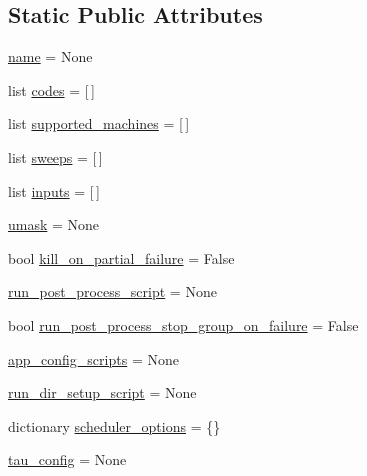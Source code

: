 \subsection*{Static Public Attributes}
\begin{DoxyCompactItemize}
\item 
\hyperlink{classcodar_1_1cheetah_1_1model_1_1_campaign_abc6944cb247705f1e7059d59537836d0}{name} = None
\item 
list \hyperlink{classcodar_1_1cheetah_1_1model_1_1_campaign_a963d2407a8818742d80cdabd0b462dc6}{codes} = \mbox{[}$\,$\mbox{]}
\item 
list \hyperlink{classcodar_1_1cheetah_1_1model_1_1_campaign_a06c63b2936ba8b23426ce41472dcbfd4}{supported\+\_\+machines} = \mbox{[}$\,$\mbox{]}
\item 
list \hyperlink{classcodar_1_1cheetah_1_1model_1_1_campaign_a298ec8ce182bf48901b0a40332de3c6d}{sweeps} = \mbox{[}$\,$\mbox{]}
\item 
list \hyperlink{classcodar_1_1cheetah_1_1model_1_1_campaign_a95d21ac374c6126edc3c82b8f953b9af}{inputs} = \mbox{[}$\,$\mbox{]}
\item 
\hyperlink{classcodar_1_1cheetah_1_1model_1_1_campaign_a7923c1c6debd3f7ce3c1730d21cdfb80}{umask} = None
\item 
bool \hyperlink{classcodar_1_1cheetah_1_1model_1_1_campaign_a1b3525f75cec5b7d738a1aea32c44612}{kill\+\_\+on\+\_\+partial\+\_\+failure} = False
\item 
\hyperlink{classcodar_1_1cheetah_1_1model_1_1_campaign_a86d1217f25978d2210e2ddd6d2a99937}{run\+\_\+post\+\_\+process\+\_\+script} = None
\item 
bool \hyperlink{classcodar_1_1cheetah_1_1model_1_1_campaign_a063e53373a2750fcdbf7eec7ebaa101b}{run\+\_\+post\+\_\+process\+\_\+stop\+\_\+group\+\_\+on\+\_\+failure} = False
\item 
\hyperlink{classcodar_1_1cheetah_1_1model_1_1_campaign_a434f06408e6b364e0efc232fa107eb33}{app\+\_\+config\+\_\+scripts} = None
\item 
\hyperlink{classcodar_1_1cheetah_1_1model_1_1_campaign_aa7d421cedfa8ffb615f6fd8f38b208ef}{run\+\_\+dir\+\_\+setup\+\_\+script} = None
\item 
dictionary \hyperlink{classcodar_1_1cheetah_1_1model_1_1_campaign_a6c58ab5dac64e6ab4796c6e6de6347c7}{scheduler\+\_\+options} = \{\}
\item 
\hyperlink{classcodar_1_1cheetah_1_1model_1_1_campaign_a28e44a6ede93e17d40627bd9a31fa8d3}{tau\+\_\+config} = None
\item 

\end{DoxyCompactItemize}
